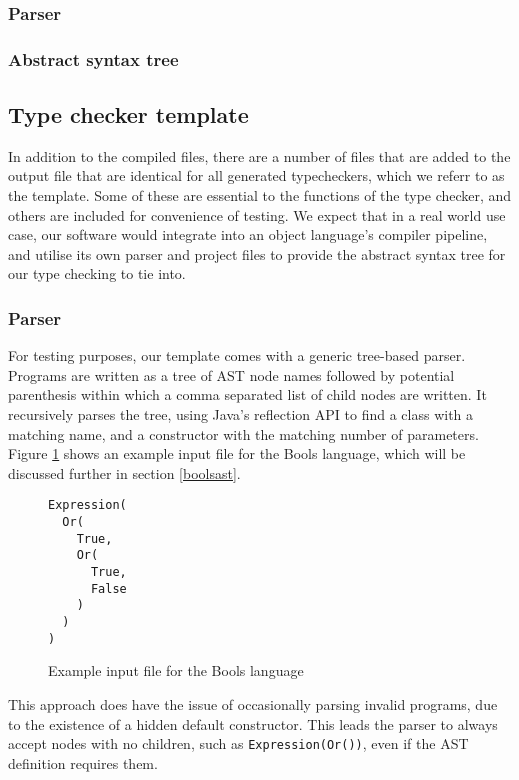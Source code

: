 \documentclass[nofilelist]{cslthse-msc}
\begin{document}
\subsubsection{Parser}
\subsubsection{Abstract syntax tree}

\subsection{Type checker template}
In addition to the compiled files, there are a number of files that are added to the output file that are identical for all generated typecheckers, which we referr to as the template.
Some of these are essential to the functions of the type checker, and others are included for convenience of testing.
We expect that in a real world use case, our software would integrate into an object language's compiler pipeline, and utilise its own parser and project files to provide the abstract syntax tree for our type checking to tie into.
\subsubsection{Parser}\label{treebasedparser}
For testing purposes, our template comes with a generic tree-based parser.
Programs are written as a tree of AST node names followed by potential parenthesis within which a comma separated list of child nodes are written.
It recursively parses the tree, using Java's reflection API to find a class with a matching name, and a constructor with the matching number of parameters.
Figure \ref{boolinputexample} shows an example input file for the Bools language, which will be discussed further in section \ref{boolsast}.

\begin{figure}[h]
\begin{lstlisting}[]
Expression(
  Or(
    True,
    Or(
      True,
      False
    )
  )
)
\end{lstlisting}
  \caption{Example input file for the Bools language}
  \label{boolinputexample}
\end{figure}

This approach does have the issue of occasionally parsing invalid programs, due to the existence of a hidden default constructor. This leads the parser to always accept nodes with no children, such as \lstinline{Expression(Or())}, even if the AST definition requires them.
\end{document}
